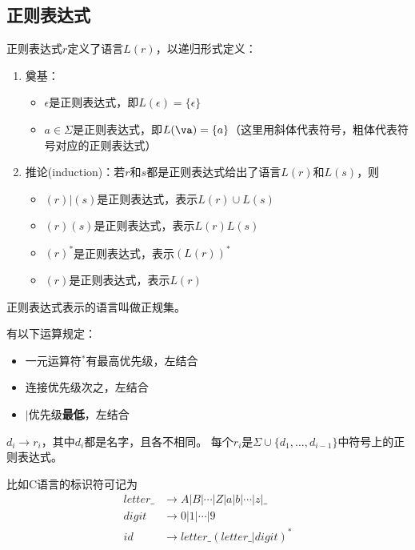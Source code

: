 \subsection{正则表达式}
\begin{definition}
正则表达式$r$定义了语言$L(r)$，以递归形式定义：
\begin{enumerate}
	\item 奠基：
	\begin{itemize}
		\item $\epsilon$是正则表达式，即$L(\epsilon)=\{\epsilon\}$
		\item $a\in\Sigma$是正则表达式，即$L(\va)=\{a\}$（这里用斜体代表符号，粗体代表符号对应的正则表达式）
	\end{itemize}
	\item 推论(induction)：若$r$和$s$都是正则表达式给出了语言$L(r)$和$L(s)$，则
	\begin{itemize}
		\item $(r)|(s)$是正则表达式，表示$L(r)\cup L(s)$
		\item $(r)(s)$是正则表达式，表示$L(r)L(s)$
		\item $(r)^*$是正则表达式，表示$(L(r))^*$
		\item $(r)$是正则表达式，表示$L(r)$
	\end{itemize}
\end{enumerate}
正则表达式表示的语言叫做正规集。
\end{definition}

有以下运算规定：
\begin{itemize}
	\item 一元运算符${}^*$有最高优先级，左结合
	\item 连接优先级次之，左结合
	\item $|$优先级\textbf{最低}，左结合
\end{itemize}

\begin{definition}[正则定义]
$d_i\to r_i$，其中$d_i$都是名字，且各不相同。
每个$r_i$是$\Sigma\cup\{d_1,\ldots,d_{i-1}\}$中符号上的正则表达式。
\end{definition}
\begin{example}
比如C语言的标识符可记为
\[\begin{aligned}
letter\_ &\to A|B|\cdots|Z|a|b|\cdots|z|\_\\
digit &\to 0|1|\cdots|9\\
id &\to letter\_(letter\_|digit)^*
\end{aligned}\]
\end{example}

